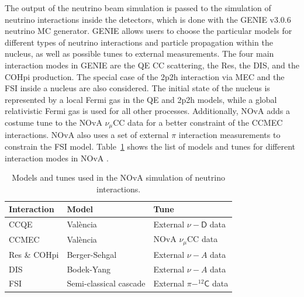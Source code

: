 
The output of the neutrino beam simulation is passed to the simulation of neutrino interactions inside the detectors, which is done with the GENIE v3.0.6~\cite{GENIE.pdf} neutrino \gls{MC} generator. GENIE allows users to choose the particular models for different types of neutrino interactions and particle propagation within the nucleus, as well as possible tunes to external measurements. The four main interaction modes in GENIE are the \gls{QE} \gls{CC} scattering, the \gls{Res}, the \gls{DIS}, and the \gls{COHpi} production. The special case of the \gls{2p2h} interaction via \gls{MEC} and the \gls{FSI} inside a nucleus are also considered. The initial state of the nucleus is represented by a local Fermi gas in the \gls{QE} and {2p2h} models, while a global relativistic Fermi gas is used for all other processes. Additionally, \gls{NOvA} adds a costume tune to the \gls{NOvA} $\nu_\mu$\gls{CC} data for a better constraint of the \gls{CC}\gls{MEC} interactions. \gls{NOvA} also uses a set of external $\pi$ interaction measurements to constrain the \gls{FSI} model. Table~\ref{tab:NuIntSimulationModels} shows the list of models and tunes for different interaction modes in \gls{NOvA} \cite{NOvAResults2021.pdf}.

\begin{table}[!ht]
\centering
\caption{Models and tunes used in the NOvA simulation of neutrino interactions.}
\begin{tabular}{|l|l|l|}
\hline
Interaction & Model                  & Tune\\\hline
\gls{CC}\gls{QE} & Val\`{e}ncia \cite{ValenciaModel_NOvACCQE_2004.pdf} & External $\nu-\textsf{D}$ data \cite{NuDeuteriumScattering_NOvACCQETune_2016.pdf}\\
\gls{CC}\gls{MEC} & Val\`{e}ncia \cite{ValenciaModel_NOvACCQEMEC_2011.pdf,ValenciaModel_NOvAMEC_2013.pdf} & \gls{NOvA} $\nu_\mu$\gls{CC} data\\
\gls{Res} \& \gls{COHpi} & Berger-Sehgal \cite{BergerSehgal_ResonancePionProd_2007.pdf,BergerSehgalModel_CohPionProd_2009.pdf}          & External $\nu-A$ data\\
\gls{DIS} & Bodek-Yang \cite{BodekYangModel_NOvADIS_2003.pdf,HadronizationModelForNuDIS_NOvADIS_1988.pdf}            & External $\nu-A$ data\\
\gls{FSI} & Semi-classical cascade \cite{FSIModel_hNSemiClassicalCascade_1988.pdf} & External $\pi-^{12}\textsf{C}$ data\\\hline
\end{tabular}
\label{tab:NuIntSimulationModels}
\end{table}

